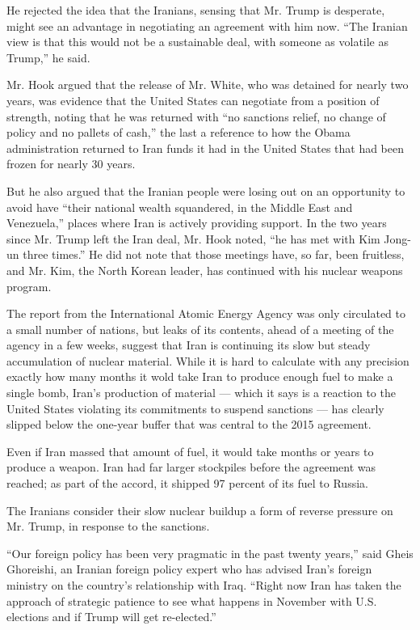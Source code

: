 He rejected the idea that the Iranians, sensing that Mr. Trump is
desperate, might see an advantage in negotiating an agreement with him
now. ``The Iranian view is that this would not be a sustainable deal,
with someone as volatile as Trump,'' he said.

Mr. Hook argued that the release of Mr. White, who was detained for
nearly two years, was evidence that the United States can negotiate from
a position of strength, noting that he was returned with ``no sanctions
relief, no change of policy and no pallets of cash,'' the last a
reference to how the Obama administration returned to Iran funds it had
in the United States that had been frozen for nearly 30 years.

But he also argued that the Iranian people were losing out on an
opportunity to avoid have ``their national wealth squandered, in the
Middle East and Venezuela,'' places where Iran is actively providing
support. In the two years since Mr. Trump left the Iran deal, Mr. Hook
noted, ``he has met with Kim Jong-un three times.'' He did not note that
those meetings have, so far, been fruitless, and Mr. Kim, the North
Korean leader, has continued with his nuclear weapons program.

The report from the International Atomic Energy Agency was only
circulated to a small number of nations, but leaks of its contents,
ahead of a meeting of the agency in a few weeks, suggest that Iran is
continuing its slow but steady accumulation of nuclear material. While
it is hard to calculate with any precision exactly how many months it
wold take Iran to produce enough fuel to make a single bomb, Iran's
production of material --- which it says is a reaction to the United
States violating its commitments to suspend sanctions --- has clearly
slipped below the one-year buffer that was central to the 2015
agreement.

Even if Iran massed that amount of fuel, it would take months or years
to produce a weapon. Iran had far larger stockpiles before the agreement
was reached; as part of the accord, it shipped 97 percent of its fuel to
Russia.

The Iranians consider their slow nuclear buildup a form of reverse
pressure on Mr. Trump, in response to the sanctions.

``Our foreign policy has been very pragmatic in the past twenty years,''
said Gheis Ghoreishi, an Iranian foreign policy expert who has advised
Iran's foreign ministry on the country's relationship with Iraq. ``Right
now Iran has taken the approach of strategic patience to see what
happens in November with U.S. elections and if Trump will get
re-elected.''


